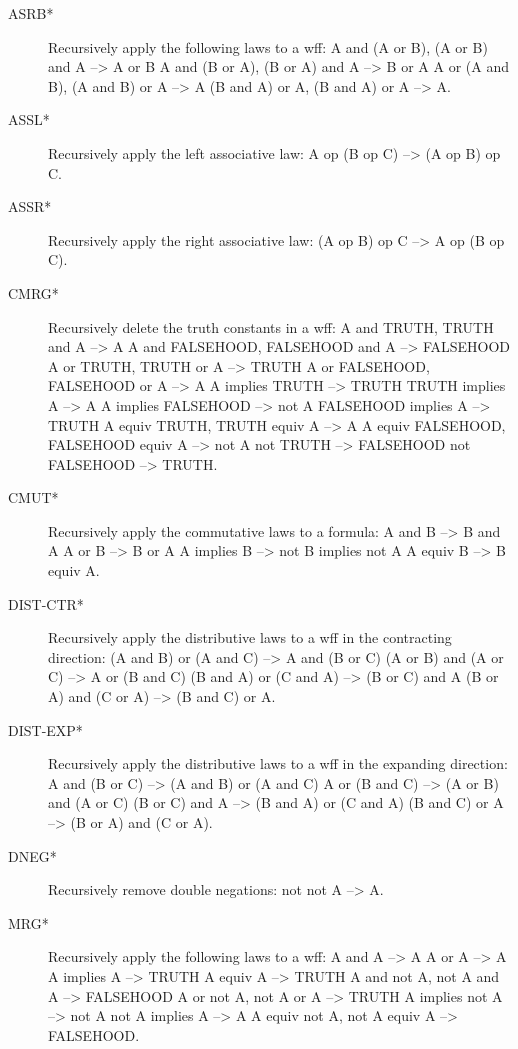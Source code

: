 \begin{description} 
\item[ASRB*]  
Recursively apply the following laws to a wff:
   A and (A or B), (A or B) and A --> A or B
   A and (B or A), (B or A) and A --> B or A
   A or (A and B), (A and B) or A --> A
   (B and A) or A, (B and A) or A --> A.

\item[ASSL*]  
Recursively apply the left associative law:
   A op (B op C) --> (A op B) op C.

\item[ASSR*]  
Recursively apply the right associative law:
   (A op B) op C --> A op (B op C).

\item[CMRG*]  
Recursively delete the truth constants in a wff:
   A and TRUTH, TRUTH and A --> A
   A and FALSEHOOD, FALSEHOOD and A --> FALSEHOOD
   A or TRUTH, TRUTH or A --> TRUTH
   A or FALSEHOOD, FALSEHOOD or A --> A
   A implies TRUTH --> TRUTH
   TRUTH implies A --> A
   A implies FALSEHOOD --> not A
   FALSEHOOD implies A --> TRUTH
   A equiv TRUTH, TRUTH equiv A --> A
   A equiv FALSEHOOD, FALSEHOOD equiv A --> not A
   not TRUTH --> FALSEHOOD
   not FALSEHOOD --> TRUTH.

\item[CMUT*]  
Recursively apply the commutative laws to a formula:
   A and B --> B and A
   A or B --> B or A
   A implies B --> not B implies not A
   A equiv B --> B equiv A.

\item[DIST-CTR*]  
Recursively apply the distributive laws to a wff in 
   the contracting direction:
  (A and B) or (A and C) --> A and (B or C)
  (A or B) and (A or C) --> A or (B and C)
  (B and A) or (C and A) --> (B or C) and A 
  (B or A) and (C or A) --> (B and C) or A.

\item[DIST-EXP*]  
Recursively apply the distributive laws to a wff in 
   the expanding direction:
   A and (B or C) --> (A and B) or (A and C)
   A or (B and C) --> (A or B) and (A or C)
   (B or C) and A --> (B and A) or (C and A)
   (B and C) or A --> (B or A) and (C or A).

\item[DNEG*]  
Recursively remove double negations:
   not not A --> A.

\item[MRG*]  
Recursively apply the following laws to a wff:
   A and A --> A
   A or A --> A
   A implies A --> TRUTH
   A equiv A --> TRUTH
   A and not A, not A and A --> FALSEHOOD
   A or not A, not A or A --> TRUTH
   A implies not A --> not A
   not A implies A --> A
   A equiv not A, not A equiv A --> FALSEHOOD.


\end{description}
